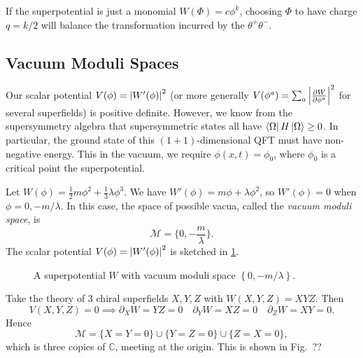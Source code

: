 \begin{example}[monomial]
  If the superpotential is just a monomial $W(\Phi) = c \phi^k$, choosing $\Phi$ to have charge $q = k / 2$ will balance the transformation incurred by the $\theta^+ \theta^-$.
\end{example}

\subsection{Vacuum Moduli Spaces}%

Our scalar potential $V(\phi) = \abs{W'(\phi)}^2$ (or more generally $ V(\phi^a) = \sum_a \abs{\frac{\partial W}{\partial \phi^a}}^2$ for several superfields) is positive definite. However, we know from the supersymmetry algebra that supersymmetric states all have $\bra{\Omega} H \ket{\Omega} \geq 0$.
In particular, the ground state of this $(1 + 1)$-dimensional QFT must have non-negative energy. This in the vacuum, we require $\phi(x, t) = \phi_0$, where $\phi_0$ is a critical point the superpotential.

\begin{example}[]
  Let $W (\phi) = \frac{1}{2} m \phi^2 + \frac{1}{3} \lambda \phi^3$. We have $W'(\phi) = m \phi + \lambda \phi^2$, so $W'(\phi) = 0$ when  $\phi = 0, - m / \lambda$.
  In this case, the space of possible vacua, called the \emph{vacuum moduli space}, is 
  \begin{equation}
    \mathcal{M} = \{0, -\frac{m}{\lambda}\}.
  \end{equation}
  The scalar potential $V(\phi) = \abs{W'(\phi)}^2$ is sketched in \ref{fig:l12f1}.
  \begin{figure}[ht]
    \centering
    \caption{A superpotential $W$ with vacuum moduli space $\left\{0, -m / \lambda\right\}$.}
    \label{fig:l12f1}
  \end{figure}
\end{example}

\begin{example}[]
  Take the theory of 3 chiral superfields $X, Y, Z$ with $W(X, Y, Z) = XY Z$.
  Then
  \begin{equation}
    V(X, Y, Z) = 0 \implies \partial_X W = Y Z  = 0 \quad \partial_Y W = X Z = 0 \quad \partial_Z W = X Y = 0.
  \end{equation}
  Hence
  \begin{equation}
    \mathcal{M} = \{X = Y = 0\} \cup \{Y = Z = 0\} \cup \{Z = X = 0\},
  \end{equation}
  which is three copies of $\mathbb{C}$, meeting at the origin. 
  This is shown in Fig.~??
\end{example}
